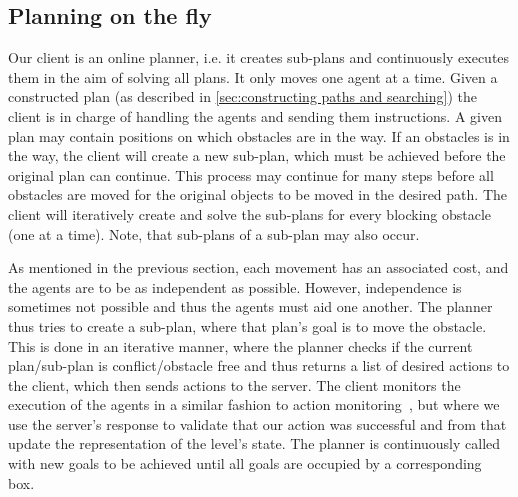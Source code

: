 \subsection{Planning on the fly}
\label{sec:planning on the fly}

Our client is an online planner, i.e. it creates sub-plans and continuously executes them in the aim of solving all plans.
It only moves one agent at a time.
Given a constructed plan (as described in \cref{sec:constructing paths and searching}) the client is in charge of handling the agents and sending them instructions.
A given plan may contain positions on which obstacles are in the way.
If an obstacles is in the way, the client will create a new sub-plan, which must be achieved before the original plan can continue.
This process may continue for many steps before all obstacles are moved for the original objects to be moved in the desired path.
The client will iteratively create and solve the sub-plans for every blocking obstacle (one at a time).
Note, that sub-plans of a sub-plan may also occur.

As mentioned in the previous section, each movement has an associated cost, and the agents are to be as independent as possible.
However, independence is sometimes not possible and thus the agents must aid one another.
The planner thus tries to create a sub-plan, where that plan's goal is to move the obstacle.
This is done in an iterative manner, where the planner checks if the current plan/sub-plan is conflict/obstacle free and thus returns a list of desired actions to the client, which then sends actions to the server.
The client monitors the execution of the agents in a similar fashion to action monitoring~\cite{russell2009modern}, but where we use the server's response to validate that our action was successful and from that update the representation of the level's state.
The planner is continuously called with new goals to be achieved until all goals are occupied by a corresponding box.
